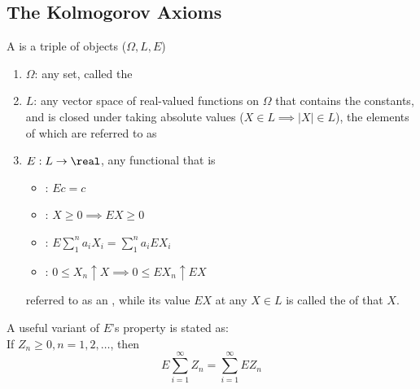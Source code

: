 \documentclass[11pt]{article}
\numberwithin{equation}{section}
\begin{document}
\subsection{The Kolmogorov Axioms}
A  is a triple of objects ($\Omega, L, E$)
\begin{enumerate}
	\item $\Omega$: any set, called the 
	\item $L$: any vector space of real-valued functions on $\Omega$ that contains the constants, and is closed under taking absolute values ($X \in L \implies |X| \in L$), the elements of which are referred to as 
	\item $E: L \rightarrow \real$, any functional that is 
	\begin{itemize}
		\item {}: $Ec = c$
		\item {}: $X \geq 0 \implies EX \geq 0$
		\item {}: $E\sum_1^na_iX_i = \sum_1^na_iEX_i$
		\item {}: $0\leq X_n \uparrow X \implies 0 \leq EX_n \uparrow EX$
	\end{itemize}
	referred to as an , while its value $EX$ at any $X \in L$ is called the  of that $X$.
\end{enumerate} 

\property[continuity]
A useful variant of $E$'s  property is stated as:\\
If $Z_n \geq 0, n = 1, 2, \hdots$, then 
\begin{equation}
	E\sum_{i=1}^\infty Z_n = \sum_{i=1}^\infty EZ_n
\end{equation}
\end{document}
